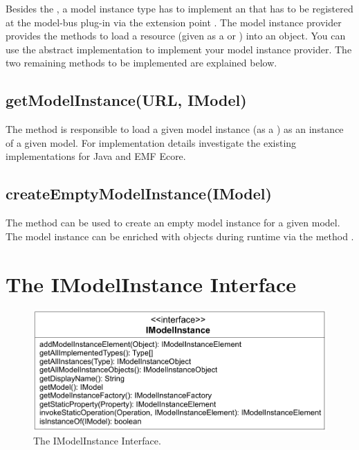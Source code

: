 Besides the , a model instance type has to implement an  that has to be registered at the model-bus plug-in via the extension point . The model instance provider provides the methods to load a resource (given as a  or ) into an  object. You can use the abstract implementation  to implement your model instance provider. The two remaining methods to be implemented are explained below.


\subsection{getModelInstance(URL, IModel)}

The method  is responsible to load a given model instance (as a ) as an instance of a given model. For implementation details investigate the existing implementations for Java and \acs{EMF} Ecore.


\subsection{createEmptyModelInstance(IModel)}

The method  can be used to create an empty model instance for a given model. The model instance can be enriched with objects during runtime via the method .



\section{The IModelInstance Interface}

\begin{figure}
	\centering
	\includegraphics[width=0.8\linewidth]{figures/modelInstanceTypeAdaptation/modelInstanceInterface}
	\caption{The IModelInstance Interface.}
	\label{pic:modelInstanceTypeAdaptation:modelInstanceInterface}
\end{figure}

